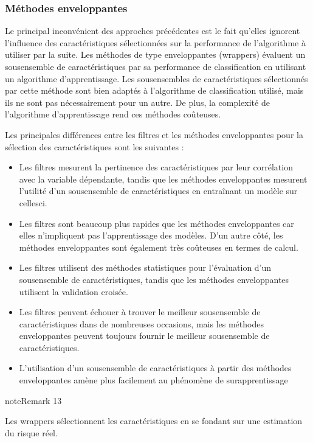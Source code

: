 \documentclass[letterpaper,10pt,english]{jupyterBook}
\begin{document}
\subsubsection{Méthodes enveloppantes}
\label{\detokenize{selection:methodes-enveloppantes}}
\sphinxAtStartPar
Le principal inconvénient des approches précédentes est le fait qu’elles ignorent l’influence des caractéristiques sélectionnées sur la performance de l’algorithme à utiliser par la suite. Les méthodes de type enveloppantes (wrappers)  évaluent un sous\sphinxhyphen{}ensemble de caractéristiques par sa performance
de classification en utilisant un algorithme d’apprentissage.  Les sous\sphinxhyphen{}ensembles de caractéristiques sélectionnés par cette méthode sont bien adaptés à l’algorithme de classification utilisé, mais ils ne sont pas nécessairement pour un autre. De plus, la complexité de l’algorithme d’apprentissage rend ces méthodes coûteuses.

\sphinxAtStartPar
Les principales différences entre les filtres et les méthodes enveloppantes pour la sélection des caractéristiques sont les suivantes :
\begin{itemize}
\item {} 
\sphinxAtStartPar
Les filtres mesurent la pertinence des caractéristiques par leur corrélation avec la variable dépendante, tandis que les méthodes enveloppantes mesurent l’utilité d’un sous\sphinxhyphen{}ensemble de caractéristiques en entraînant un modèle sur celles\sphinxhyphen{}ci.

\item {} 
\sphinxAtStartPar
Les filtres sont beaucoup plus rapides que les méthodes enveloppantes car elles n’impliquent pas l’apprentissage des modèles. D’un autre côté, les méthodes enveloppantes sont également très coûteuses en termes de calcul.

\item {} 
\sphinxAtStartPar
Les filtres utilisent des méthodes statistiques pour l’évaluation d’un sous\sphinxhyphen{}ensemble de caractéristiques, tandis que les méthodes enveloppantes utilisent la validation croisée.

\item {} 
\sphinxAtStartPar
Les filtres peuvent échouer à trouver le meilleur sous\sphinxhyphen{}ensemble de caractéristiques dans de nombreuses occasions, mais les méthodes enveloppantes peuvent toujours fournir le meilleur sous\sphinxhyphen{}ensemble de caractéristiques.

\item {} 
\sphinxAtStartPar
L’utilisation d’un sous\sphinxhyphen{}ensemble de caractéristiques à partir des méthodes enveloppantes amène plus facilement au phénomène de surapprentissage

\end{itemize}
\label{selection:remark-1}
\begin{sphinxadmonition}{note}{Remark 13}



\sphinxAtStartPar
Les wrappers sélectionnent les caractéristiques en se fondant sur une estimation du risque réel.
\end{sphinxadmonition}
\end{document}
